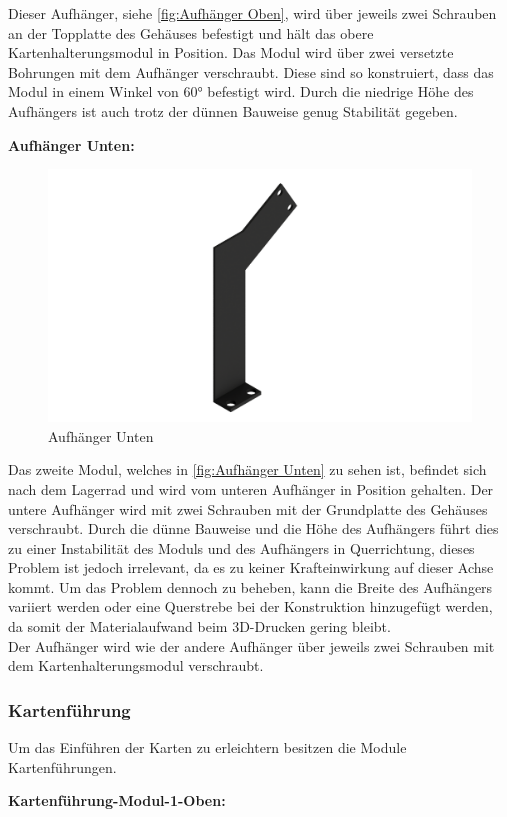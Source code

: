 Dieser Aufhänger, siehe \autoref{fig:Aufhänger Oben}, wird über jeweils zwei Schrauben an der Topplatte des Gehäuses befestigt und hält das obere Kartenhalterungsmodul in Position.
Das Modul wird über zwei versetzte Bohrungen mit dem Aufhänger verschraubt.
Diese sind so konstruiert, dass das Modul in einem Winkel von 60° befestigt wird.
Durch die niedrige Höhe des Aufhängers ist auch trotz der dünnen Bauweise genug Stabilität gegeben.


\textbf{Aufhänger Unten:}

\begin{figure}
    \includegraphics[width=8 cm]{fig/mech/AufhaengerIUnten}
    \caption{Aufhänger Unten}
    \label{fig:Aufhänger Unten}
\end{figure}

Das zweite Modul, welches in \autoref{fig:Aufhänger Unten} zu sehen ist, befindet sich nach dem Lagerrad und wird vom unteren Aufhänger in Position gehalten.
Der untere Aufhänger wird mit zwei Schrauben mit der Grundplatte des Gehäuses verschraubt.
Durch die dünne Bauweise und die Höhe des Aufhängers führt dies zu einer Instabilität des Moduls und des Aufhängers in Querrichtung, dieses Problem ist jedoch irrelevant, da es
zu keiner Krafteinwirkung auf dieser Achse kommt.
Um das Problem dennoch zu beheben, kann die Breite des Aufhängers variiert werden oder eine Querstrebe bei der Konstruktion hinzugefügt werden, da somit der Materialaufwand beim 3D-Drucken gering bleibt.\\
Der Aufhänger wird wie der andere Aufhänger über jeweils zwei Schrauben mit dem Kartenhalterungsmodul verschraubt.


\subsubsection{Kartenführung}
Um das Einführen der Karten zu erleichtern besitzen die Module Kartenführungen.

\textbf{Kartenführung-Modul-1-Oben:}

